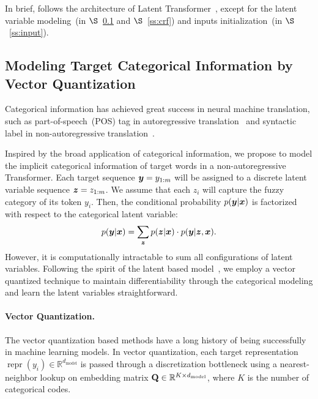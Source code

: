 In brief, \method follows the architecture of Latent Transformer~\cite{lt}, except for the latent variable modeling~(in $\S$~\ref{ss:vq} and $\S$~\ref{ss:crf}) and inputs initialization~(in $\S$~\ref{ss:input}). 




\subsection{Modeling Target Categorical Information by Vector Quantization}\label{ss:vq}
Categorical information has achieved great success in neural machine translation, such as part-of-speech~(POS) tag in autoregressive translation~\cite{latent_pos} and syntactic label in non-autoregressive translation~\cite{syn_st}.

Inspired by the broad application of categorical information, we propose to model the implicit categorical information of target words in a non-autoregressive Transformer. 
Each target sequence $\bm y=y_{1:m}$ will be assigned to a discrete latent variable sequence $\bm z = z_{1:m}$. 
We assume that each $z_i$ will capture the fuzzy category of its token $y_i$.
Then, the conditional probability $p(\bm y|\bm x)$ is factorized with respect to the categorical latent variable:
\begin{equation}\label{eqn:pos}
    p(\bm y|\bm x) = \sum_{\bm z} p(\bm z | \bm x) \cdot p(\bm y|\bm z,\bm x).
\end{equation}
However, it is computationally intractable to sum all configurations of latent variables. 
Following the spirit of the latent based model~\cite{lt,vqvae}, we employ a vector quantized technique to maintain differentiability through the categorical modeling and learn the latent variables straightforward.

\paragraph{Vector Quantization.}
The vector quantization based methods have a long history of being successfully in machine learning models. 
In vector quantization, each target representation $\operatorname{repr}(y_i) \in \mathbb{R}^{d_\text{model}}$ is passed through a discretization bottleneck using a nearest-neighbor lookup on embedding matrix $\mathbf{Q}\in \mathbb{R}^{K \times d_\text{model}}$, where $K$ is the number of categorical codes.

